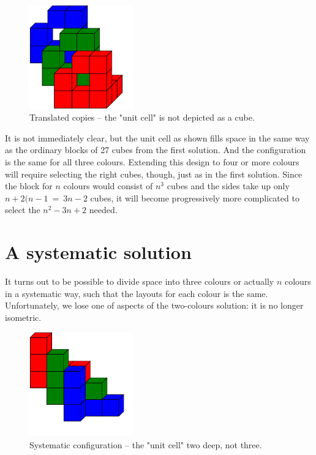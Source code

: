 \documentclass[onecolumn]{article}
\begin{document}
\begin{figure}
\center
\caption{Translated copies -- the "unit cell" is not depicted as a cube.}
\label{translated_three_colours}
\includegraphics[width=0.4\textwidth]{translated_three_colours.pdf}
\end{figure}

It is not immediately clear, but the unit cell as shown fills space in the same way as
the ordinary blocks of 27 cubes from the first solution. And the configuration is the same
for all three colours. Extending this design to four or more colours will require selecting
the right cubes, though, just as in the first solution. Since the block for $n$ colours would
consist of $n^3$ cubes and the sides take up only $n+2(n-1 ~=~ 3n-2$ cubes, it will become
progressively more complicated to select the $n^2 - 3n + 2$ needed.


\section*{A systematic solution}
It turns out to be possible to divide space into three colours or actually $n$ colours
in a systematic way, such that the layouts for each colour is the same. Unfortunately,
we lose one of aspects of the two-colours solution: it is no longer isometric.

\begin{figure}
\center
\caption{Systematic configuration -- the "unit cell" two deep, not three.}
\label{systematic_three_colours}
\includegraphics[width=0.4\textwidth]{systematic_three_colours.pdf}
\end{figure}
\end{document}
